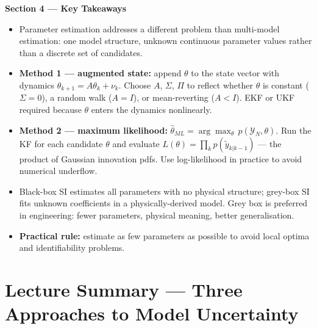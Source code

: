 \documentclass[12pt, a4paper]{article}
\begin{document}
\begin{keybox}
  \textbf{Section 4 --- Key Takeaways}
  \begin{itemize}[leftmargin=1.2em, itemsep=2pt]
    \item Parameter estimation addresses a different problem than
      multi-model estimation: one model structure, unknown continuous
      parameter values rather than a discrete set of candidates.
    \item \textbf{Method 1 --- augmented state:} append $\theta$ to the
      state vector with dynamics $\theta_{k+1} = A\theta_k + \nu_k$.
      Choose $A$, $\Sigma$, $\Pi$ to reflect whether $\theta$ is
      constant ($\Sigma = 0$), a random walk ($A = I$), or mean-reverting
      ($A < I$).
      EKF or UKF required because $\theta$ enters the dynamics
      nonlinearly.
    \item \textbf{Method 2 --- maximum likelihood:}
      $\hat{\theta}_{ML} = \arg\max_\theta\,p(\mathcal{Y}_N,\theta)$.
      Run the KF for each candidate $\theta$ and evaluate
      $L(\theta) = \prod_k p(\tilde{y}_{k|k-1})$ --- the product of
      Gaussian innovation pdfs.
      Use log-likelihood in practice to avoid numerical underflow.
    \item Black-box SI estimates all parameters with no physical
      structure; grey-box SI fits unknown coefficients in a
      physically-derived model.
      Grey box is preferred in engineering: fewer parameters, physical
      meaning, better generalisation.
    \item \textbf{Practical rule:} estimate as few parameters as possible
      to avoid local optima and identifiability problems.
  \end{itemize}
\end{keybox}

\clearpage
\section*{Lecture Summary --- Three Approaches to Model Uncertainty}
\end{document}
